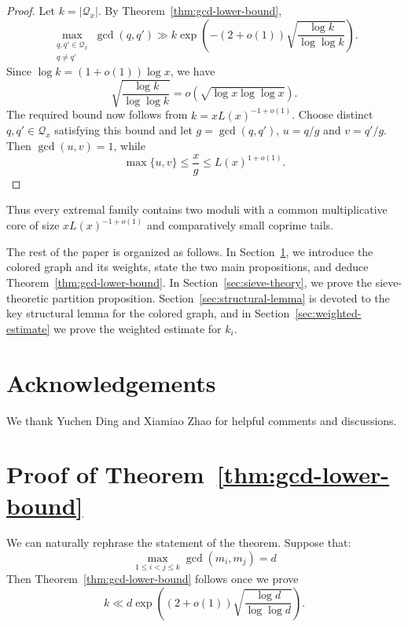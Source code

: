 \documentclass[11pt]{amsart}
\theoremstyle{remark}
\begin{document}
\begin{proof}
  Let $k=|\mathcal Q_x|$.  By Theorem~\ref{thm:gcd-lower-bound},
  \[
    \max_{\substack{q,q'\in\mathcal Q_x\\q\neq q'}}\gcd(q,q')
    \gg k\exp\!\left(-(2+o(1))
      \sqrt{\frac{\log k}{\log\log k}}\right).
  \]
  Since $\log k=(1+o(1))\log x$, we have
  \[
    \sqrt{\frac{\log k}{\log\log k}}
    =o\!\left(\sqrt{\log x\log\log x}\right).
  \]
  The required bound now follows from
  $k=xL(x)^{-1+o(1)}$.
  Choose distinct $q,q'\in\mathcal Q_x$ satisfying this bound and let
  $g=\gcd(q,q')$, $u=q/g$ and $v=q'/g$.  Then $\gcd(u,v)=1$, while
  \[
    \max\{u,v\}\leq \frac{x}{g}\leq L(x)^{1+o(1)}.
  \]
\end{proof}

Thus every extremal family contains two moduli with a common multiplicative
core of size $xL(x)^{-1+o(1)}$ and comparatively small coprime tails.

The rest of the paper is organized as follows.  In
Section~\ref{sec:reduction}, we introduce the colored graph and its weights,
state the two main propositions, and deduce
Theorem~\ref{thm:gcd-lower-bound}.  In
Section~\ref{sec:sieve-theory}, we prove the sieve-theoretic partition
proposition.  Section~\ref{sec:structural-lemma} is devoted to the key
structural lemma for the colored graph, and in
Section~\ref{sec:weighted-estimate} we prove the
weighted estimate for $k_i$.

\section*{Acknowledgements}

We thank Yuchen Ding and Xiamiao Zhao for helpful comments and discussions.

\section{Proof of Theorem~\ref{thm:gcd-lower-bound}}\label{sec:reduction}

We can naturally rephrase the statement of the theorem. Suppose that:
\begin{equation} \label{eq:max-gcd-d}
  \max_{1 \leq i < j \leq k} \gcd(m_i, m_j) = d
\end{equation}
Then Theorem~\ref{thm:gcd-lower-bound} follows once we prove
\[
  k \ll d \exp\!\left((2 + o(1))
  \sqrt{\frac{\log d}{\log \log d}}\right).
\]
\end{document}
